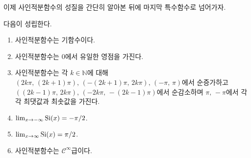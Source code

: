 이제 사인적분함수의 성질을 간단히 알아본 뒤에 마지막 특수함수로 넘어가자.

\begin{theorem}
    다음이 성립한다.
    \begin{enumerate}
        \item 사인적분함수는 기함수이다.
        \item 사인적분함수는 $0$에서 유일한 영점을 가진다.
        \item 사인적분함수는 각 $k\in\mathbb{N}$에 대해 $(2k\pi,\,(2k+1)\pi),\,(-(2k+1)\pi,\,2k\pi),\,(-\pi,\,\pi)$에서 순증가하고 $((2k-1)\pi,\,2k\pi),\,(-2k\pi,\,-(2k-1)\pi)$에서 순감소하며 $\pi,\,-\pi$에서 각각 최댓값과 최솟값을 가진다.
        \item $\lim_{x\to-\infty}\mathrm{Si}(x)=-\pi/2$.
        \item $\lim_{x\to\infty}\mathrm{Si}(x)=\pi/2$.
        \item 사인적분함수는 $\mathcal{C}^\infty$급이다.
    \end{enumerate}
\end{theorem}

